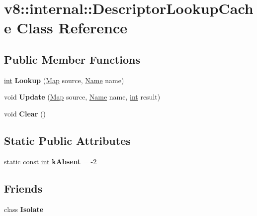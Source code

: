 \hypertarget{classv8_1_1internal_1_1DescriptorLookupCache}{}\section{v8\+:\+:internal\+:\+:Descriptor\+Lookup\+Cache Class Reference}
\label{classv8_1_1internal_1_1DescriptorLookupCache}
\subsection*{Public Member Functions}
\begin{DoxyCompactItemize}
\item 
\mbox{\label{classv8_1_1internal_1_1DescriptorLookupCache_a6591e19202b3845e1b7d224f64eaba56}} 
\mbox{\hyperlink{classint}{int}} {\bfseries Lookup} (\mbox{\hyperlink{classv8_1_1internal_1_1Map}{Map}} source, \mbox{\hyperlink{classv8_1_1internal_1_1Name}{Name}} name)
\item 
\mbox{\label{classv8_1_1internal_1_1DescriptorLookupCache_a4f29d7dd38b52f24871de1da5409c916}} 
void {\bfseries Update} (\mbox{\hyperlink{classv8_1_1internal_1_1Map}{Map}} source, \mbox{\hyperlink{classv8_1_1internal_1_1Name}{Name}} name, \mbox{\hyperlink{classint}{int}} result)
\item 
\mbox{\label{classv8_1_1internal_1_1DescriptorLookupCache_a00f0f0d03b3c4698ae2b5b4ce23d92d4}} 
void {\bfseries Clear} ()
\end{DoxyCompactItemize}
\subsection*{Static Public Attributes}
\begin{DoxyCompactItemize}
\item 
\mbox{\label{classv8_1_1internal_1_1DescriptorLookupCache_a5c88488d5dfd0cb4d26b07dc96ceaf60}} 
static const \mbox{\hyperlink{classint}{int}} {\bfseries k\+Absent} = -\/2
\end{DoxyCompactItemize}
\subsection*{Friends}
\begin{DoxyCompactItemize}
\item 
\mbox{\label{classv8_1_1internal_1_1DescriptorLookupCache_aba4f0964bdacf2bbf62cf876e5d28d0a}} 
class {\bfseries Isolate}
\end{DoxyCompactItemize}


